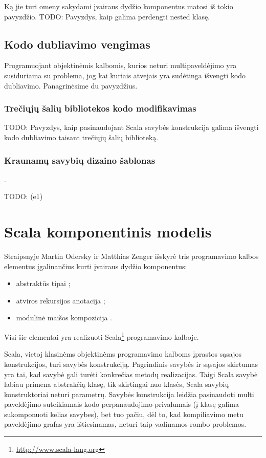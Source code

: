 Ką jie turi omeny sakydami įvairaus dydžio komponentus matosi
iš tokio pavyzdžio.
TODO: Pavyzdys, kaip galima perdengti nested klasę.

\subsection{Kodo dubliavimo vengimas}

Programuojant objektinėmis kalbomis, kurios neturi multipaveldėjimo
yra susiduriama su problema, jog kai kuriais atvejais yra sudėtinga
išvengti kodo dubliavimo. Panagrinėsime du pavyzdžius.

\subsubsection{Trečiųjų šalių bibliotekos kodo modifikavimas}

TODO: Pavyzdys, kaip pasinaudojant Scala savybės  konstrukcija
galima išvengti kodo dubliavimo taisant trečiųjų šalių biblioteką.

\subsubsection{Kraunamų savybių dizaino šablonas}

\cite[267p.]{programming-in-scala}.

TODO: (e1)

\section{Scala komponentinis modelis}

Straipsnyje \cite{scalable-component-abstractions} Martin Odersky
ir Matthias Zenger išskyrė tris programavimo kalbos elementus
įgalinančius kurti įvairaus dydžio  komponentus:
\begin{itemize}
  \item abstraktūs tipai ;
  \item atviros rekursijos anotacija ;
  \item modulinė maišos kompozicija .
\end{itemize}
Visi šie elementai yra realizuoti
Scala\footnote{\url{http://www.scala-lang.org}} programavimo kalboje.

Scala, vietoj klasinėms objektinėms programavimo kalboms įprastos
sąsajos  konstrukcijos, turi savybės 
konstrukciją. Pagrindinis savybės ir sąsajos skirtumas yra tai, kad
savybė gali turėti konkrečias metodų realizacijas. Taigi Scala
savybė labiau primena abstrakčią klasę, tik skirtingai nuo klasės,
Scala savybių konstruktoriai neturi parametrų. Savybės konstrukcija
leidžia pasinaudoti multi paveldėjimo suteikiamais kodo perpanaudojimo
privalumais (į klasę galima sukomponuoti kelias savybes), bet tuo
pačiu, dėl to, kad kompiliavimo metu paveldėjimo grafas yra
ištiesinamas, neturi taip vadinamos rombo problemos.

